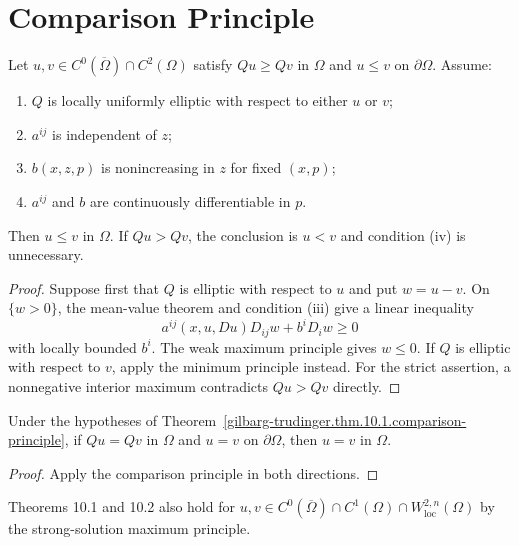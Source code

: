 \section{Comparison Principle}

\begin{theorem}
\label{gilbarg-trudinger.thm.10.1.comparison-principle}
Let $u,v\in C^0(\overline\Omega)\cap C^2(\Omega)$ satisfy
$Qu\ge Qv$ in $\Omega$ and $u\le v$ on $\partial\Omega$.  Assume:
\begin{enumerate}
\item[(i)] $Q$ is locally uniformly elliptic with respect to either $u$ or $v$;
\item[(ii)] $a^{ij}$ is independent of $z$;
\item[(iii)] $b(x,z,p)$ is nonincreasing in $z$ for fixed $(x,p)$;
\item[(iv)] $a^{ij}$ and $b$ are continuously differentiable in $p$.
\end{enumerate}
Then $u\le v$ in $\Omega$.  If $Qu>Qv$, the conclusion is $u<v$ and
condition \textup{(iv)} is unnecessary.
\end{theorem}
\begin{proof}
\sketch Suppose first that $Q$ is elliptic with respect to $u$ and put
$w=u-v$.  On $\{w>0\}$, the mean-value theorem and condition \textup{(iii)}
give a linear inequality
\[
a^{ij}(x,u,Du)D_{ij}w+b^iD_iw\ge0
\]
with locally bounded $b^i$.  The weak maximum principle gives $w\le0$.
If $Q$ is elliptic with respect to $v$, apply the minimum principle instead.
For the strict assertion, a nonnegative interior maximum contradicts
$Qu>Qv$ directly.
\end{proof}

\begin{theorem}
\label{gilbarg-trudinger.thm.10.2.dirichlet-uniqueness}
Under the hypotheses of Theorem~\ref{gilbarg-trudinger.thm.10.1.comparison-principle},
if $Qu=Qv$ in $\Omega$ and $u=v$ on $\partial\Omega$, then $u=v$ in
$\Omega$.
\end{theorem}
\begin{proof}
\sketch Apply the comparison principle in both directions.
\end{proof}

Theorems 10.1 and 10.2 also hold for
$u,v\in C^0(\overline\Omega)\cap C^1(\Omega)
\cap W^{2,n}_{\mathrm{loc}}(\Omega)$ by the strong-solution maximum principle.

